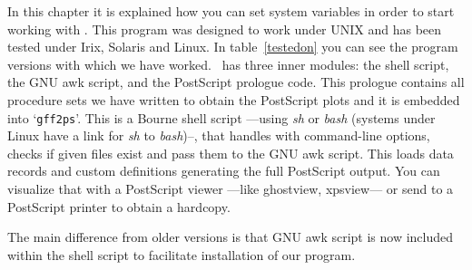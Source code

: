 %
%
%
%

	
In this chapter it is explained how you can set system variables in order to start working with \prog. This program was designed to work under UNIX and has been tested under Irix, Solaris and Linux. In table~\ref{testedon} you can see the program versions with which we have worked. \prog\ has three inner modules: the shell script, the GNU awk script, and the PostScript prologue code. This prologue contains all procedure sets we have written to obtain the PostScript plots and it is embedded into `\texttt{gff2ps}'. This is a Bourne shell script ---using \textit{sh} or \textit{bash} (systems under Linux have a link for \textit{sh} to \textit{bash})--, that handles with command-line options, checks if given files exist and pass them to the GNU awk script. This loads data records and custom definitions generating the full PostScript output. You can visualize that with a PostScript viewer ---like ghostview, xpsview--- or send to a PostScript printer to obtain a hardcopy.\par

The main difference from older versions is that GNU awk script is now included within the shell script to facilitate installation of our program.\par

	

	

	
